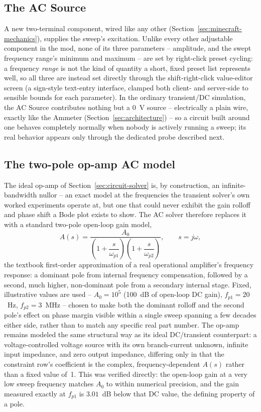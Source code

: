\subsection{The AC Source}
\label{sec:ac-source}

A new two-terminal component, wired like any other (Section~\ref{sec:minecraft-mechanics}),
supplies the sweep's excitation. Unlike every other adjustable component in the mod, none of its
three parameters -- amplitude, and the swept frequency range's minimum and maximum -- are set by
right-click preset cycling: a frequency \emph{range} is not the kind of quantity a short, fixed
preset list represents well, so all three are instead set directly through the shift-right-click
value-editor screen (a sign-style text-entry interface, clamped both client- and server-side to
sensible bounds for each parameter). In the
ordinary transient/DC simulation, the AC Source contributes nothing but a 0~V source -- electrically
a plain wire, exactly like the Ammeter (Section~\ref{sec:architecture}) -- so a circuit built
around one behaves completely normally when nobody is actively running a sweep; its real behavior
appears only through the dedicated probe described next.

\subsection{The two-pole op-amp AC model}

The ideal op-amp of Section~\ref{sec:circuit-solver} is, by construction, an infinite-bandwidth
nullor -- an exact model at the frequencies the transient solver's own worked experiments operate
at, but one that could never exhibit the gain rolloff and phase shift a Bode plot exists to show.
The AC solver therefore replaces it with a standard two-pole open-loop gain model,
\begin{equation}
A(s) = \frac{A_0}{\left(1 + \dfrac{s}{\omega_{p1}}\right)\left(1 + \dfrac{s}{\omega_{p2}}\right)},
\qquad s = j\omega,
\end{equation}
the textbook first-order approximation of a real operational amplifier's frequency response: a
dominant pole from internal frequency compensation, followed by a second, much higher, non-dominant
pole from a secondary internal stage. Fixed, illustrative values are used -- $A_0 = 10^5$ (100~dB
of open-loop DC gain), $f_{p1} = 20$~Hz, $f_{p2} = 3$~MHz -- chosen to make both the dominant
rolloff and the second pole's effect on phase margin visible within a single sweep spanning a few
decades either side, rather than to match any specific real part number. The op-amp remains
modeled the same structural way as its ideal DC/transient counterpart: a voltage-controlled
voltage source with its own branch-current unknown, infinite input impedance, and zero output
impedance, differing only in that the constraint row's coefficient is the complex, frequency-dependent
$A(s)$ rather than a fixed value of~1. This was verified directly: the open-loop gain at a very
low sweep frequency matches $A_0$ to within numerical precision, and the gain measured exactly at
$f_{p1}$ is $3.01$~dB below that DC value, the defining property of a pole.

